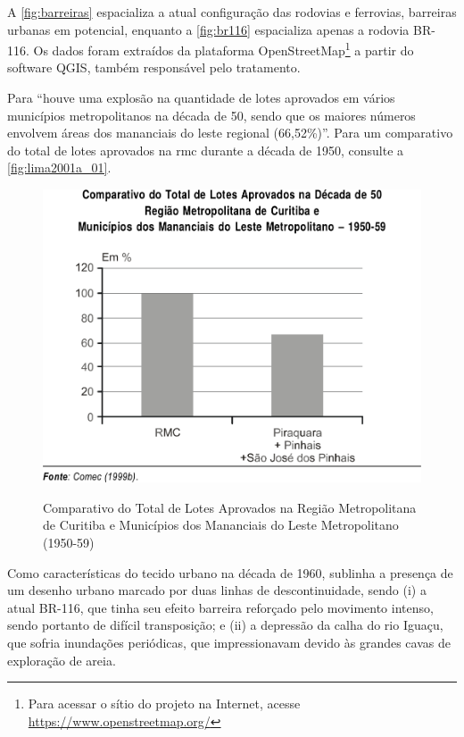 	A \autoref{fig:barreiras} espacializa a atual configuração das rodovias e ferrovias, barreiras urbanas em potencial, enquanto a \autoref{fig:br116} espacializa apenas a rodovia BR-116. Os dados foram extraídos da plataforma OpenStreetMap\footnote{Para acessar o sítio do projeto na Internet, acesse \url{https://www.openstreetmap.org/}} a partir do software QGIS, também responsável pelo tratamento.

	Para  ``houve uma explosão na quantidade de lotes aprovados em vários municípios metropolitanos na década de 50, sendo que os maiores números envolvem áreas dos mananciais do leste regional (66,52\%)''. Para um comparativo do total de lotes aprovados na \gls{rmc} durante a década de 1950, consulte a \autoref{fig:lima2001a_01}.
	
	\begin{figure}
		\centering
		\caption{Comparativo do Total de Lotes Aprovados na Região Metropolitana de Curitiba e Municípios dos Mananciais do Leste Metropolitano (1950-59)}
		\includegraphics[width=0.6\linewidth]{img/lima2001a_01}
		\label{fig:lima2001a_01}
	\end{figure}
	
	Como características do tecido urbano na década de 1960,  sublinha a presença de um desenho urbano marcado por duas linhas de descontinuidade, sendo (i) a atual BR-116, que tinha seu efeito barreira reforçado pelo movimento intenso, sendo portanto de difícil transposição; e (ii) a depressão da calha do rio Iguaçu, que sofria inundações periódicas, que impressionavam devido às grandes cavas de exploração de areia.
	
